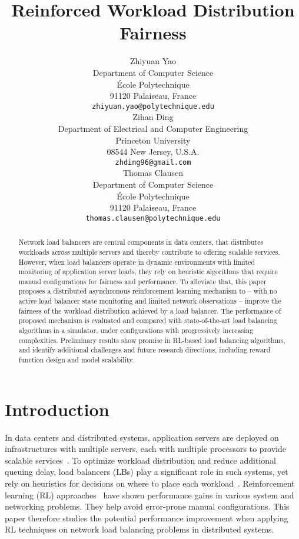\documentclass{article}
\title{Reinforced Workload Distribution Fairness}
\author{%
  Zhiyuan Yao\\
  Department of Computer Science\\
  \'Ecole Polytechnique\\
  91120 Palaiseau, France \\
  \texttt{zhiyuan.yao@polytechnique.edu} \\
   \And
   Zihan Ding \\
   Department of Electrical and Computer Engineering\\
   Princeton University\\
   08544 New Jersey, U.S.A. \\
   \texttt{zhding96@gmail.com} \\
   \And
   Thomas Clausen\\
    Department of Computer Science\\
      \'Ecole Polytechnique\\
      91120 Palaiseau, France \\
  \texttt{thomas.clausen@polytechnique.edu} \\
}
\begin{document}
\maketitle

\begin{abstract}
  Network load balancers are central components in data centers, that distributes workloads across multiple servers and thereby contribute to offering scalable services.
  However, when load balancers operate in dynamic environments with limited monitoring of application server loads, they rely on heuristic algorithms that require manual configurations for fairness and performance.
  To alleviate that, this paper proposes a distributed asynchronous reinforcement learning mechanism to -- with no active load balancer state monitoring and limited network observations -- improve the fairness of the workload distribution achieved by a load balancer.
  The performance of proposed mechanism is evaluated and compared with state-of-the-art load balancing algorithms in a simulator, under configurations with progressively increasing complexities.
  Preliminary results show promise in RL-based load balancing algorithms, and identify additional challenges and future research directions, including reward function design and model scalability.
\end{abstract}

\section{Introduction}
\label{sec:intro}
In data centers and distributed systems, application servers are deployed on infrastructures with multiple servers, each with multiple processors to provide scalable services~\cite{dragoni2017microservices}.
To optimize workload distribution and reduce additional queuing delay, load balancers (LBs) play a significant role in such systems, yet rely on heuristics for decisions on where to place each workload~\cite{lvs, maglev, 6lb, incab2018}.
Reinforcement learning (RL) approaches~\cite{auto2018sigcomm, decima2018, drl-udn-2019, sivakumar2019mvfst} have shown performance gains in various system and networking problems.
They help avoid error-prone manual configurations.
This paper therefore studies the potential performance improvement when applying RL techniques on network load balancing problems in distributed systems.
\end{document}
